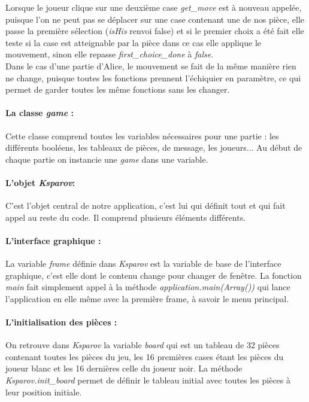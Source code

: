 \documentclass[a4paper]{article}
\begin{document}
Lorsque le joueur clique sur une deuxième case \textit{get\_move} est à nouveau appelée, puisque l'on ne peut pas se déplacer sur une case contenant une de nos pièce, elle passe la première sélection (\textit{isHis} renvoi false) et si le premier choix a été fait elle teste si la case est atteignable par la pièce dans ce cas elle applique le mouvement, sinon elle repasse \textit{first\_choice\_done} à \textit{false}. \\

Dans le cas d'une partie d'Alice, le mouvement se fait de la même manière rien ne change, puisque toutes les fonctions prennent l'échiquier en paramètre, ce qui permet de garder toutes les même fonctions sans les changer. 

\paragraph{La classe \textit{game} :}Cette classe comprend toutes les variables nécessaires pour une partie : les différents booléens, les tableaux de pièces, de message, les joueurs... Au début de chaque partie on instancie une \textit{game} dans une variable. 

\paragraph{L'objet \textit{Ksparov}:}C'est l'objet central de notre application, c'est lui qui définit tout et qui fait appel au reste du code. Il comprend plusieurs éléments différents. 

\paragraph{L'interface graphique :}La variable \textit{frame} définie dans \textit{Ksparov} est la variable de base de l'interface graphique, c'est elle dont le contenu change pour changer de fenêtre. La fonction \textit{main} fait simplement appel à la méthode \textit{application.main(Array())} qui lance l'application en elle même avec la première frame, à savoir le menu principal. 

\paragraph{L'initialisation des pièces :}On retrouve dans \textit{Ksparov} la variable \textit{board} qui est un tableau de 32 pièces contenant toutes les pièces du jeu, les 16 premières cases étant les pièces du joueur blanc et les 16 dernières celle du joueur noir. La méthode \textit{Ksparov.init\_board} permet de définir le tableau initial avec toutes les pièces à leur position initiale.
\end{document}
